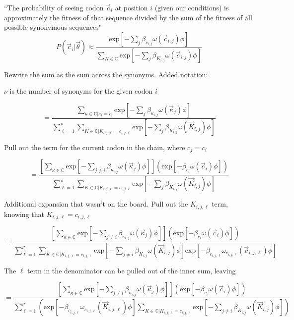 \documentclass[11pt]{article} %
\begin{document}
``The probability of seeing codon $\vec{c}_i$ at position $i$ (given our conditions) is approximately the fitness of that sequence divided by the sum of the fitness of all possible synonymous sequences"
\[
P(\vec{c}_i | \vec{\theta})
\approx
\frac{
\mbox{exp}\left[-\sum_{j} \beta_{c_{i,j}} \omega (\vec{c}_{i,j}) \phi \right]
}{
\sum _{K \in \mathbb{C}}
\mbox{exp}\left[-\sum_{j} \beta_{K_{i,j}} \omega (\vec{c}_{i,j}) \phi \right]
}
\]


Rewrite the sum as the sum across the synonyms.
Added notation: 

$\nu$ is the number of synonyms for the given codon $i$

\[
=
\frac{
\sum _{\kappa \in \mathbb{C} | \kappa_i = c_i}
\mbox{exp}\left[-\sum_{j} \beta_{\kappa_{i,j}} \omega (\vec{\kappa}_j) \phi \right]
}{
\sum_{\ell=1}^\nu
\sum _{K \in \mathbb{C} | K_{i,j,\ell} = c_{i,j,\ell}}
\mbox{exp}\left[-\sum_{j} \beta_{K_{i,j}} \omega (\vec{K}_{i,j}) \phi \right]
}
\]

Pull out the term for the current codon in the chain, where $c_j=c_i$

\[
=
\frac{
\left[
\sum _{\kappa \in \mathbb{C}}
\mbox{exp}\left[-\sum_{j\neq i} \beta_{\kappa_{i,j}} \omega (\vec{\kappa}_j) \phi \right]
\right]
\left(\mbox{exp}\left[-\beta_{c_i} \omega (\vec{c}_i) \phi \right]\right)
}{
\sum_{\ell=1}^\nu
\sum _{K \in \mathbb{C} | K_{i,j,\ell} = c_{i,j,\ell}}
\mbox{exp}\left[-\sum_{j} \beta_{K_{i,j}} \omega (\vec{K}_{i,j}) \phi \right]
}
\]


Additional expansion that wasn't on the board. Pull out the $K_{i,j,\ell}$ term, knowing that $K_{i,j,\ell}=c_{i,j,\ell}$

\[
=
\frac{
\left[
\sum _{\kappa \in \mathbb{C}}
\mbox{exp}\left[-\sum_{j\neq i} \beta_{\kappa_{i,j}} \omega (\vec{\kappa}_j) \phi \right]
\right]
\left(\mbox{exp}\left[-\beta_{c_i} \omega (\vec{c}_i) \phi \right]\right)
}{
\sum_{\ell=1}^\nu
\sum _{K \in \mathbb{C} | K_{i,j,\ell} = c_{i,j,\ell}}
\mbox{exp}\left[-\sum_{j\neq i} \beta_{K_{i,j}} \omega (\vec{K}_{i,j}) \phi \right]
\mbox{exp}\left[-\beta_{c_{i,j,\ell}} \omega_{c_{i,j,\ell}} (\vec{c}_{i,j,\ell}) \phi \right]
}
\]

The $\ell$ term in the denominator can be pulled out of the inner sum, leaving

\[
=
\frac{
\left[
\sum _{\kappa \in \mathbb{C}}
\mbox{exp}\left[-\sum_{j\neq i} \beta_{\kappa_{i,j}} \omega (\vec{\kappa}_j) \phi \right]
\right]
\left(\mbox{exp}\left[-\beta_{c_i} \omega (\vec{c}_i) \phi \right]\right)
}{
\sum_{\ell=1}^\nu
\left(
\mbox{exp}\left[-\beta_{c_{i,j,\ell}} \omega_{c_{i,j,\ell}} (\vec{K}_{i,j,\ell}) \phi \right]
\sum _{K \in \mathbb{C} | K_{i,j,\ell} = c_{i,j,\ell}}
\mbox{exp}\left[-\sum_{j\neq i} \beta_{K_{i,j}} \omega (\vec{K}_{i,j}) \phi \right]
\right)
}
\]
\end{document}
